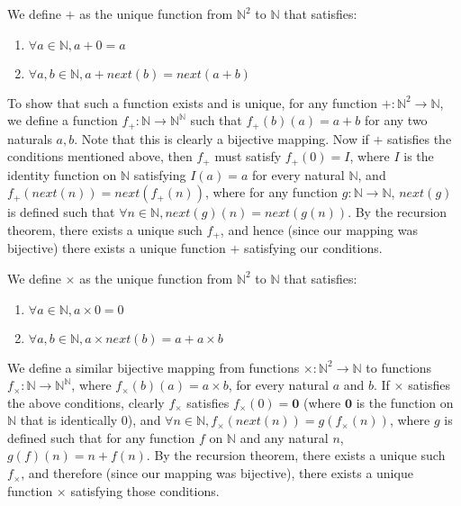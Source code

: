 \documentclass[12pt]{report}
\begin{document}
We define $+$ as the unique function from $\mathbb{N}^2$ to $\mathbb{N}$ that satisfies:
\begin{enumerate}
  \item $\forall a \in \mathbb{N}, a + 0 = a$
  \item $\forall a, b \in \mathbb{N}, a + next(b) = next(a + b)$
\end{enumerate}


To show that such a function exists and is unique, for any  function $+ : \mathbb{N}^2 \rightarrow \mathbb{N}$, we define a function $f_{+} : \mathbb{N} \rightarrow \mathbb{N}^{\mathbb{N}}$ such that $f_{+}(b)(a) = a + b$ for any two naturals $a, b$. Note that this is clearly a bijective mapping. Now if $+$ satisfies the conditions mentioned above, then $f_{+}$ must satisfy $f_{+}(0) = I$, where $I$ is the identity function on $\mathbb{N}$ satisfying $I(a) = a$ for every natural $\mathbb{N}$, and $f_{+}(next(n)) = next(f_{+}(n))$, where for any function $g : \mathbb{N} \rightarrow \mathbb{N}$, $next(g)$ is defined such that $\forall n \in \mathbb{N}, next(g)(n) = next(g(n))$. By the recursion theorem, there exists a unique such $f_{+}$, and hence (since our mapping was bijective) there exists a unique function $+$ satisfying our conditions. 

We define $\times$ as the unique function from $\mathbb{N}^2$ to $\mathbb{N}$ that satisfies:
\begin{enumerate}
  \item $\forall a \in \mathbb{N}, a \times 0 = 0$
  \item $\forall a, b \in \mathbb{N}, a \times next(b) = a + a \times b$
\end{enumerate}

We define a similar bijective mapping from functions $\times : \mathbb{N}^2 \rightarrow \mathbb{N}$ to functions $f_{\times} : \mathbb{N} \rightarrow \mathbb{N}^{\mathbb{N}}$, where $f_{\times}(b)(a) = a \times b$, for every natural $a$ and $b$. If $\times$ satisfies the above conditions, clearly $f_{\times}$ satisfies $f_{\times}(0) = \mathbf{0}$ (where $\mathbf{0}$ is the function on $\mathbb{N}$ that is identically 0), and $\forall n \in \mathbb{N}, f_{\times}(next(n)) = g(f_{\times}(n))$, where $g$ is defined such that for any function $f$ on $\mathbb{N}$ and any natural $n$, $g(f)(n) = n + f(n)$. By the recursion theorem, there exists a unique such $f_{\times}$, and therefore (since our mapping was bijective), there exists a unique function $\times$ satisfying those conditions.
\end{document}
